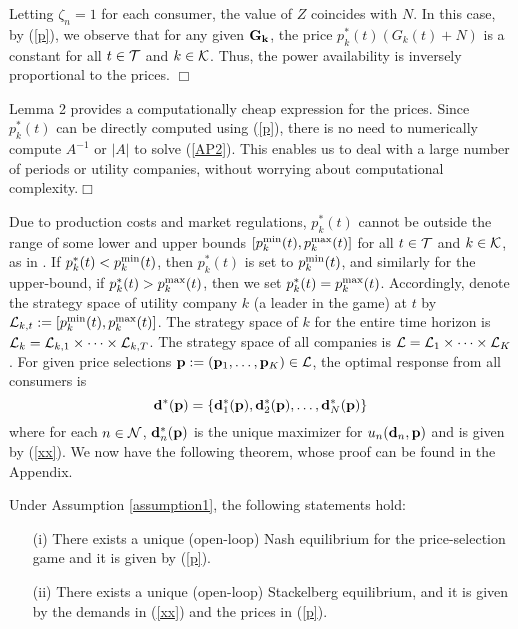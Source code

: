\begin{remark} 
Letting $\zeta_n=1$ for each consumer, the value of $Z$ coincides with $N$. In this case, by (\ref{p}), we observe that for any given ${\bf G_k}$, the price $p^*_k(t)(G_k(t)+N)$ is a constant for all $t \in {\cal T}$ and $k \in {\cal K}$.
Thus, the power availability is inversely proportional to the prices. \hfill$\Box$
\end{remark}

\begin{remark} 
Lemma 2 provides a computationally cheap expression for the prices. Since $p^*_k(t)$ can be directly computed using (\ref{p}), there is no need to numerically compute $A^{-1}$ or $|A|$ to solve (\ref{AP2}). This enables us to deal with a large number of periods or utility companies, without worrying about computational complexity.\hfill$\Box$
\end{remark}

{\color{black}Due to production costs and market regulations, $p^*_k(t)$ cannot be outside the range of some lower and upper bounds $[p^{{\rm min}}_k(t),p^{{\rm max}}_k(t)]$  for all $t \in {\cal T}$ and $k \in {\cal K}$, as in \cite{sabita}. If $p^*_k(t)<p^{{\rm min}}_k(t)$, then $p^*_k(t)$ is set to $p^{{\rm min}}_k(t)$, and similarly for the upper-bound, if  $p^*_k(t)>p^{{\rm max}}_k(t)$, then we set  $p^*_k(t)=p^{{\rm max}}_k(t)$. Accordingly, denote the strategy space of utility company $k$ (a leader in the game) at $t$ by ${\cal L}_{k,t}:=[p^{{\rm min}}_k(t),p^{{\rm max}}_k(t)]$. The strategy space of $k$ for the entire time horizon is ${\cal L}_{k}={\cal L}_{k,1}\times\dots\times{\cal L}_{k,T}$.
 The strategy space of all companies is ${\cal L}={\cal L}_{1}\times\dots\times{\cal L}_{K}$. {\color{blue} For given price selections  ${\bf{p}}:=({\bf{p}}_1,\dots,{\bf{p}}_K) \in {\cal L}$}, the optimal response from all consumers is
$${\bf{d^*(p)}}=\{{\bf{d}}_1^*({\bf{p}}),{\bf{d}}_2^*({\bf{p}}),\dots,{\bf{d}}_N^*({\bf{p}})\}$$
where for each $n \in {\cal N}$, ${\bf{d}}^{*}_{n}({\bf{p}})$ is the unique maximizer for $u_n({\bf{d}}_n,{\bf{p}})$ and is given by (\ref{xx}).
}
We now have the following theorem, whose proof can be found in the Appendix.


\begin{theorem}Under Assumption \ref{assumption1}, the following statements hold: 
\begin{itemize}
\item[(i)] There exists a unique (open-loop) Nash equilibrium for the price-selection game and it is given by (\ref{p}).\\
\item[(ii)] There exists a unique (open-loop) Stackelberg equilibrium, and it is given by the demands in (\ref{xx}) and the prices in (\ref{p}).
\end{itemize}
\label{mainTHM}
\end{theorem}

